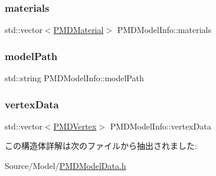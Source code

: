 \subsubsection{\texorpdfstring{materials}{materials}}
{\footnotesize\ttfamily std\+::vector$<$\mbox{\hyperlink{struct_p_m_d_material}{P\+M\+D\+Material}}$>$ P\+M\+D\+Model\+Info\+::materials}

\mbox{\label{struct_p_m_d_model_info_a756ac77e858d04d751c7bf4bc01f22d7}} 
\subsubsection{\texorpdfstring{model\+Path}{modelPath}}
{\footnotesize\ttfamily std\+::string P\+M\+D\+Model\+Info\+::model\+Path}

\mbox{\label{struct_p_m_d_model_info_a2862ab3d4b00b5600723eed89b4888ab}} 
\subsubsection{\texorpdfstring{vertex\+Data}{vertexData}}
{\footnotesize\ttfamily std\+::vector$<$\mbox{\hyperlink{struct_p_m_d_vertex}{P\+M\+D\+Vertex}}$>$ P\+M\+D\+Model\+Info\+::vertex\+Data}



この構造体詳解は次のファイルから抽出されました\+:\begin{DoxyCompactItemize}
\item 
Source/\+Model/\mbox{\hyperlink{_p_m_d_model_data_8h}{P\+M\+D\+Model\+Data.\+h}}\end{DoxyCompactItemize}
